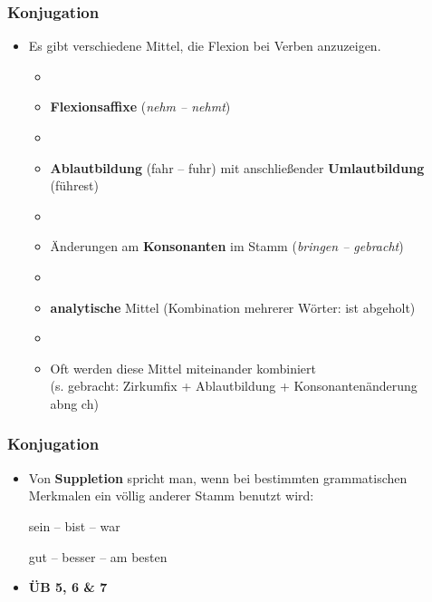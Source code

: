 
\begin{frame}
\frametitle{Konjugation}

\begin{itemize}
	\item Es gibt verschiedene Mittel, die Flexion bei Verben anzuzeigen. 
	
	\begin{itemize}
	\item[]
	\item \textbf{Flexionsaffixe} (\textit{nehm -- nehmt}) 
	\item[]
	\item \textbf{Ablautbildung} (fahr -- fuhr) mit anschließender \textbf{Umlautbildung} (führest) 
	\item[]
	\item Änderungen am \textbf{Konsonanten} im Stamm (\textit{bringen -- gebracht})
	\item[]
	\item \textbf{analytische} Mittel (Kombination mehrerer Wörter: ist abgeholt) 
	\item[]
	\item Oft werden diese Mittel miteinander kombiniert\\
	(s. gebracht: Zirkumfix  + Ablautbildung  + Konsonantenänderung \\ab{ng \ras ch})
	\end{itemize}

\end{itemize}


\end{frame}




\begin{frame}
\frametitle{Konjugation}

\begin{itemize}
	\item Von \textbf{Suppletion} spricht man, wenn bei bestimmten grammatischen Merkmalen ein völlig anderer Stamm benutzt wird:
	
\vspace{1em}
	
	\ea sein -- bist -- war
	\z
	
	\ea gut -- besser -- am besten
	\z
	
\vspace{6em}	
	
	\item \textbf{ÜB 5, 6 \& 7}
	
\end{itemize}


\end{frame}



%
%
%
%
%




